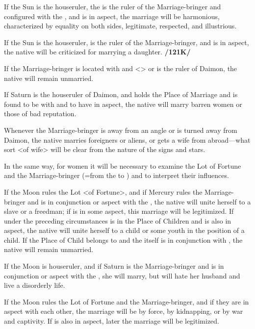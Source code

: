 If the Sun is the houseruler, the \Moon\xspace is the ruler of the Marriage-bringer and configured with the \Sun, and \Jupiter\xspace is in aspect, the marriage will be harmonious, characterized by equality on both sides, legitimate, respected, and illustrious. 

If the Sun is the houseruler, \Venus\xspace is the
ruler of the Marriage-bringer, and \Saturn\xspace is in aspect, the native will be criticized for marrying a daughter. \textbf{/121K/} 

If the Marriage-bringer is located with \Saturn\xspace and <\Saturn> or \Mars\xspace is the ruler of Daimon, the native will remain unmarried. 

If Saturn is the houseruler of Daimon, and \Venus\xspace holds the Place of Marriage and is found to be with \Mercury\xspace and to have \Mars\xspace in aspect, the native will marry barren women or those of bad reputation. 

Whenever the Marriage-bringer is away from an angle or is turned away from Daimon, the native marries foreigners or aliens, or gets a wife from abroad—what sort <of wife> will be clear from the nature of the signs and stars.

In the same way, for women it will be necessary to examine the Lot of Fortune and the Marriage-bringer (=from the \Moon\xspace to \Mars) and to interpret their influences. 

If the Moon rules the Lot <of Fortune>, and if Mercury rules the Marriage-bringer and is in conjunction or aspect with the \Moon, the native will unite herself to a slave or a freedman; if \Jupiter\xspace is in some aspect, this marriage will be legitimized. If under the preceding circumstances \Jupiter\xspace is in the Place of Children and \Saturn\xspace is also in aspect, the native
will unite herself to a child or some youth in the position of a child. If the Place of Child belongs to \Saturn\xspace and the \Moon\xspace itself is in conjunction with \Saturn, the native will remain unmarried. 

If the Moon is houseruler, and if Saturn is the Marriage-bringer and is in conjunction or aspect with the \Moon, she will marry, but will hate her husband and live a disorderly life. 

If the Moon rules the Lot of Fortune and \Mars\xspace
the Marriage-bringer, and if they are in aspect with each other, the marriage will be by force, by kidnapping, or by war and captivity. If \Jupiter\xspace is also in aspect, later the marriage will be legitimized. 

